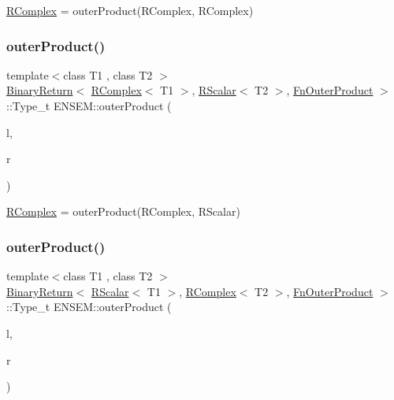 \mbox{\hyperlink{classENSEM_1_1RComplex}{R\+Complex}} = outer\+Product(\+R\+Complex, R\+Complex) 

\mbox{\label{group__rcomplex_ga3452d86b3ff7fc9db6565959c2f896db}} 
\subsubsection{\texorpdfstring{outerProduct()}{outerProduct()}\hspace{0.1cm}{\footnotesize\ttfamily [2/3]}}
{\footnotesize\ttfamily template$<$class T1 , class T2 $>$ \\
\mbox{\hyperlink{structENSEM_1_1BinaryReturn}{Binary\+Return}}$<$ \mbox{\hyperlink{classENSEM_1_1RComplex}{R\+Complex}}$<$ T1 $>$, \mbox{\hyperlink{classENSEM_1_1RScalar}{R\+Scalar}}$<$ T2 $>$, \mbox{\hyperlink{structENSEM_1_1FnOuterProduct}{Fn\+Outer\+Product}} $>$\+::Type\+\_\+t E\+N\+S\+E\+M\+::outer\+Product (\begin{DoxyParamCaption}\item[{const \mbox{\hyperlink{classENSEM_1_1RComplex}{R\+Complex}}$<$ T1 $>$ \&}]{l,  }\item[{const \mbox{\hyperlink{classENSEM_1_1RScalar}{R\+Scalar}}$<$ T2 $>$ \&}]{r }\end{DoxyParamCaption})\hspace{0.3cm}{\ttfamily [inline]}}



\mbox{\hyperlink{classENSEM_1_1RComplex}{R\+Complex}} = outer\+Product(\+R\+Complex, R\+Scalar) 

\mbox{\label{group__rcomplex_ga5f17e33943ff2fbe7237c0aa4182d06c}} 
\subsubsection{\texorpdfstring{outerProduct()}{outerProduct()}\hspace{0.1cm}{\footnotesize\ttfamily [3/3]}}
{\footnotesize\ttfamily template$<$class T1 , class T2 $>$ \\
\mbox{\hyperlink{structENSEM_1_1BinaryReturn}{Binary\+Return}}$<$ \mbox{\hyperlink{classENSEM_1_1RScalar}{R\+Scalar}}$<$ T1 $>$, \mbox{\hyperlink{classENSEM_1_1RComplex}{R\+Complex}}$<$ T2 $>$, \mbox{\hyperlink{structENSEM_1_1FnOuterProduct}{Fn\+Outer\+Product}} $>$\+::Type\+\_\+t E\+N\+S\+E\+M\+::outer\+Product (\begin{DoxyParamCaption}\item[{const \mbox{\hyperlink{classENSEM_1_1RScalar}{R\+Scalar}}$<$ T1 $>$ \&}]{l,  }\item[{const \mbox{\hyperlink{classENSEM_1_1RComplex}{R\+Complex}}$<$ T2 $>$ \&}]{r }\end{DoxyParamCaption})\hspace{0.3cm}{\ttfamily [inline]}}



